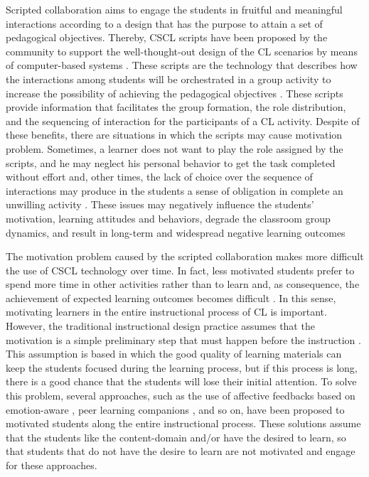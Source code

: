 Scripted collaboration aims to engage the students in fruitful and meaningful interactions according to a design that has the purpose to attain a set of pedagogical objectives. Thereby, CSCL scripts have been proposed by the community to support the well-thought-out design of the CL scenarios by means of computer-based systems \cite{FischerKollarStegmannWeckerZottmann2013,KobbeWeinbergerDillenbourgHarrerHamalainenHakkinenFischer2007}. These scripts are the technology that describes how the interactions among students will be orchestrated in a group activity to increase the possibility of achieving the pedagogical objectives \cite{WeinbergerErtlFischerMandl2005}. These scripts provide information that facilitates the group formation, the role distribution, and the sequencing of interaction for the participants of a CL activity. Despite of these benefits, there are situations in which the scripts may cause motivation problem. Sometimes, a learner does not want to play the role assigned by the scripts, and he may neglect his personal behavior to get the task completed without effort and, other times, the lack of choice over the sequence of interactions may produce in the students a sense of obligation in complete an unwilling activity \cite{ChallcoMoreiraMizoguchiIsotani2014, Isotani2009}. These issues may negatively influence the students’ motivation, learning attitudes and behaviors, degrade the classroom group dynamics, and result in long-term and widespread negative learning outcomes \cite{ChallcoMoreiraMizoguchiIsotani2014, FaloutElwoodHood2009}

The motivation problem caused by the scripted collaboration makes more difficult the use of CSCL technology over time. In fact, less motivated students prefer to spend more time in other activities rather than to learn and, as consequence, the achievement of expected learning outcomes becomes difficult \cite{Crook2000, SchoorBannert2011}. In this sense, motivating learners in the entire instructional process of CL is important. However, the traditional instructional design practice assumes that the motivation is a simple preliminary step that must happen before the instruction \cite{ChanAhern1999, Keller1987}. This assumption is based in which the good quality of learning materials can keep the students focused during the learning process, but if this process is long, there is a good chance that the students will lose their initial attention. To solve this problem, several approaches, such as the use of affective feedbacks based on emotion-aware \cite{FeidakisDaradoumisCaballeConesa2014,FeidakisCaballeDaradoumisJimenezConesa2014}, peer learning companions \cite{WoolfBurlesonArroyoDragonCooperPicard2009}, and so on, have been proposed to motivated students along the entire instructional process. These solutions assume that the students like the content-domain and/or have the desired to learn, so that students that do not have the desire to learn are not motivated and engage for these approaches.

